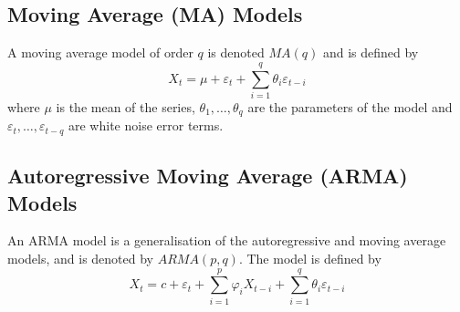 \documentclass[11pt]{report} %
\begin{document}
\subsection{Moving Average (MA) Models}
A moving average model of order $q$ is denoted $MA\left(q\right)$ and is defined by
\begin{equation}
X_{t} = \mu + \varepsilon_{t} + \sum_{i = 1}^{q}\theta_{i}\varepsilon_{t - i}
\end{equation}
where $\mu$ is the mean of the series, $\theta_{1}, \dots, \theta_{q}$ are the parameters of the model and $\varepsilon_{t}, \dots, \varepsilon_{t - q}$ are white noise error terms.

\subsection{Autoregressive Moving Average (ARMA) Models}
An ARMA model is a generalisation of the autoregressive and moving average models, and is denoted by $ARMA\left(p, q\right)$. The model is defined by
\begin{equation}
X_{t} = c + \varepsilon_{t} + \sum_{i = 1}^{p}\varphi_{i}X_{t - i} + \sum_{i = 1}^{q}\theta_{i}\varepsilon_{t - i}
\end{equation}
\end{document}
